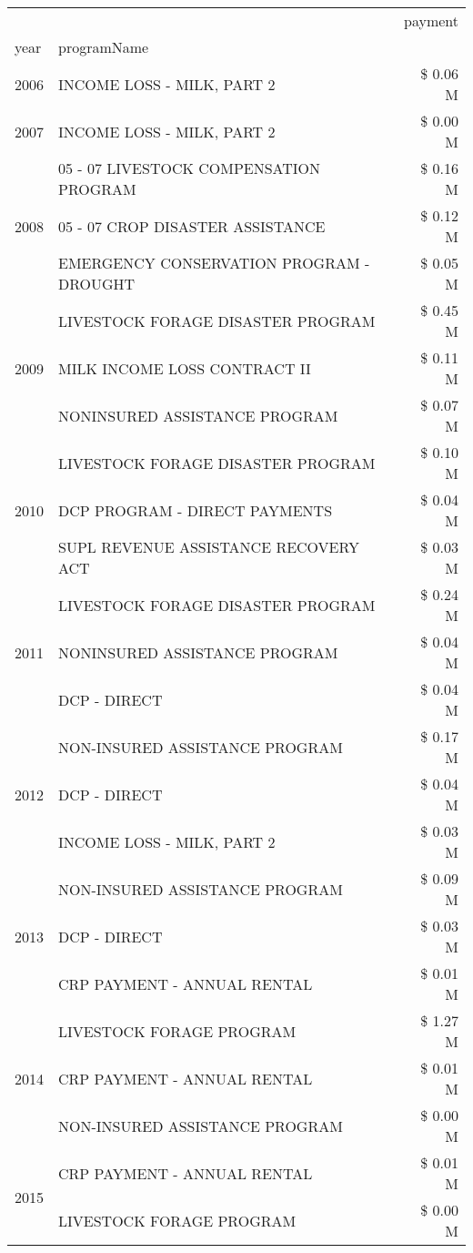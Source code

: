 \begin{tabular}{llr}
\toprule
 &  & payment \\
year & programName &  \\
\midrule
2006 & INCOME LOSS - MILK, PART 2 & \$ 0.06 M \\
\cline{1-3}
2007 & INCOME LOSS - MILK, PART 2 & \$ 0.00 M \\
\cline{1-3}
\multirow[t]{3}{*}{2008} & 05 - 07 LIVESTOCK COMPENSATION PROGRAM & \$ 0.16 M \\
 & 05 - 07 CROP DISASTER ASSISTANCE & \$ 0.12 M \\
 & EMERGENCY CONSERVATION PROGRAM - DROUGHT & \$ 0.05 M \\
\cline{1-3}
\multirow[t]{3}{*}{2009} & LIVESTOCK FORAGE DISASTER  PROGRAM & \$ 0.45 M \\
 & MILK INCOME LOSS CONTRACT II & \$ 0.11 M \\
 & NONINSURED ASSISTANCE PROGRAM & \$ 0.07 M \\
\cline{1-3}
\multirow[t]{3}{*}{2010} & LIVESTOCK FORAGE DISASTER  PROGRAM & \$ 0.10 M \\
 & DCP PROGRAM - DIRECT PAYMENTS & \$ 0.04 M \\
 & SUPL REVENUE ASSISTANCE RECOVERY ACT & \$ 0.03 M \\
\cline{1-3}
\multirow[t]{3}{*}{2011} & LIVESTOCK FORAGE DISASTER PROGRAM & \$ 0.24 M \\
 & NONINSURED ASSISTANCE PROGRAM & \$ 0.04 M \\
 & DCP - DIRECT & \$ 0.04 M \\
\cline{1-3}
\multirow[t]{3}{*}{2012} & NON-INSURED ASSISTANCE PROGRAM & \$ 0.17 M \\
 & DCP - DIRECT & \$ 0.04 M \\
 & INCOME LOSS - MILK, PART 2 & \$ 0.03 M \\
\cline{1-3}
\multirow[t]{3}{*}{2013} & NON-INSURED ASSISTANCE PROGRAM & \$ 0.09 M \\
 & DCP - DIRECT & \$ 0.03 M \\
 & CRP PAYMENT - ANNUAL RENTAL & \$ 0.01 M \\
\cline{1-3}
\multirow[t]{3}{*}{2014} & LIVESTOCK FORAGE PROGRAM & \$ 1.27 M \\
 & CRP PAYMENT - ANNUAL RENTAL & \$ 0.01 M \\
 & NON-INSURED ASSISTANCE PROGRAM & \$ 0.00 M \\
\cline{1-3}
\multirow[t]{3}{*}{2015} & CRP PAYMENT - ANNUAL RENTAL & \$ 0.01 M \\
 & LIVESTOCK FORAGE PROGRAM & \$ 0.00 M \\

\end{tabular}
